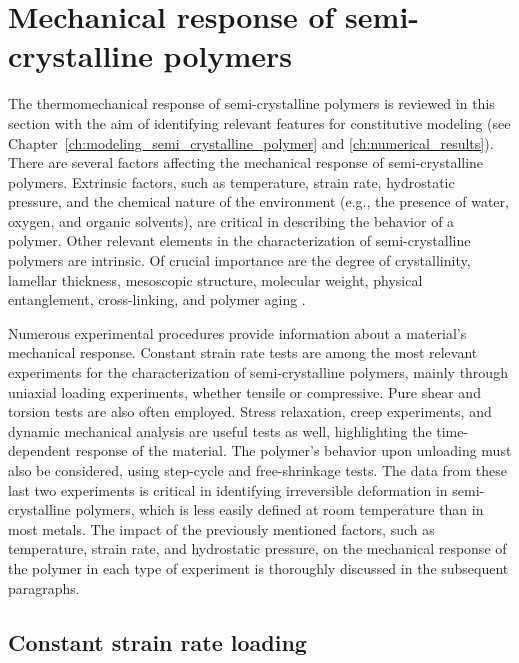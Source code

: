 \section{Mechanical response of semi-crystalline polymers}

The thermomechanical response of semi-crystalline polymers is reviewed in this section with the aim of identifying relevant features for constitutive modeling (see Chapter~\ref{ch:modeling_semi_crystalline_polymer} and \ref{ch:numerical_results}).
There are several factors affecting the mechanical response of semi-crystalline polymers.
Extrinsic factors, such as temperature, strain rate, hydrostatic pressure, and the chemical nature of the environment (e.g., the presence of water, oxygen, and organic solvents), are critical in describing the behavior of a polymer.
Other relevant elements in the characterization of semi-crystalline polymers are intrinsic.
Of crucial importance are the degree of crystallinity, lamellar thickness, mesoscopic structure, molecular weight, physical entanglement, cross-linking, and polymer aging \citep{ayoubEffectsCrystalContent2011, serbanTensilePropertiesSemicrystalline2013, callister2014materials, cundiffModelingViscoplasticBehavior2022}.

Numerous experimental procedures provide information about a material's mechanical response.
Constant strain rate tests are among the most relevant experiments for the characterization of semi-crystalline polymers, mainly through uniaxial loading experiments, whether tensile or compressive.
Pure shear and torsion tests are also often employed.
Stress relaxation, creep experiments, and dynamic mechanical analysis are useful tests as well, highlighting the time-dependent response of the material.
The polymer's behavior upon unloading must also be considered, using step-cycle and free-shrinkage tests.
The data from these last two experiments is critical in identifying irreversible deformation in semi-crystalline polymers, which is less easily defined at room temperature than in most metals.
The impact of the previously mentioned factors, such as temperature, strain rate, and hydrostatic pressure, on the mechanical response of the polymer in each type of experiment is thoroughly discussed in the subsequent paragraphs.

\subsection{Constant strain rate loading}

